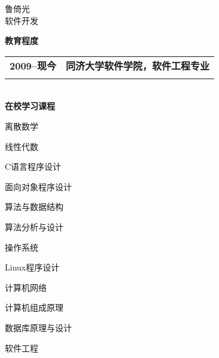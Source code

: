 \documentclass[a4paper,12pt,final]{memoir}
\newcommand \redcolor{\color{Cerulean}}
\newcommand \graycolor{\color{Gray}}
\newcommand \blackcolor{\color{Black}}
\newcommand \brandonred{\brandonfont\redcolor}
\newcommand \brandongray{\brandonfont\graycolor}
\newcommand \oslengray{\oslenfont\graycolor}
\newcommand \oslenblack{\oslenfont\blackcolor}
\newcommand{\CVSection}[1]
	{\small\brandonred\textbf{#1}\\[6pt]}
\newcommand{\CVRightTime}[1]
	{\small\oslenblack\textbf{#1}}
\newcommand{\CVRightTitle}[1]
	{\CVRightTime{#1}}
\newcommand{\CVRightSubtitle}[1]
	{\footnotesize\oslengray{#1}}
\newcommand{\CVRightMain}[1]
	{\scriptsize\oslenblack{#1}}
\newcommand{\CVEducationSection}[1]
	{\footnotesize\oslenblack\textbf{#1}}
\begin{document}
\begin{minipage}[t]{0.62\textwidth}
  \begin{flushleft}
    \vspace{0pt}
    \gillfont\Huge{鲁倚光}\\[-4pt]
    \brandongray\normalsize{软件开发}
    \\[21pt]
  \end{flushleft}
  \CVSection{教育程度}
  \begin{tabular}{@{}ll@{}}
    \CVRightTime{2009--现今} & \CVRightTitle{同济大学软件学院，软件工程专业}\\[-4pt]
                                & \CVRightSubtitle{软件工程学士}\\
  \end{tabular}
  \\[10pt]
  \CVEducationSection{在校学习课程}\\[-10pt]
  \CVRightMain{}
  \begin{multicols}{3}
    \begin{compactitem}[\color{Cerulean}$\circ$]
    \item 离散数学
    \item 线性代数

    \item C语言程序设计
    \item 面向对象程序设计

    \item 算法与数据结构
    \item 算法分析与设计

    \item 操作系统
    \item Linux程序设计

    \item 计算机网络
    \item 计算机组成原理

    \item 数据库原理与设计
    \item 软件工程


\end{compactitem}
\end{multicols}
\end{minipage}
\end{document}
